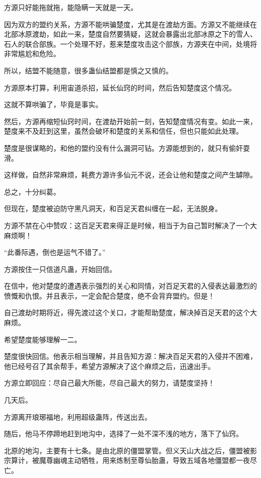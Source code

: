 \begin{this_body}
方源只好能拖就拖，能隐瞒一天就是一天。

因为双方的盟约关系，方源不能哄骗楚度，尤其是在渡劫方面。方源又不能继续在北部冰原渡劫，如此一来，楚度自然要猜疑，这就会暴露出北部冰原之下的雪人、石人的联合部族。一个处理不好，惹来楚度攻击这个部族，方源夹在中间，处境将非常尴尬和危险。

所以，结盟不能随意，很多蛊仙结盟都是慎之又慎的。

方源原本打算，利用宙道杀招，延长仙窍的时间，然后告知楚度这个情况。

这就不算哄骗了，毕竟是事实。

然后，方源再缩短仙窍时间，在渡劫开始前一刻，告知楚度情况有变。如此一来，楚度来不及赶到这里，虽然会破坏和楚度的关系和信任，但也只能如此处理。

楚度是很谋略的，和他的盟约没有什么漏洞可钻。方源能想到的，就只有偷奸耍滑。

这样做，自然非常麻烦，耗费方源许多仙元不说，还会让他和楚度之间产生罅隙。

总之，十分纠葛。

但现在，楚度被迫防守黑凡洞天，和百足天君纠缠在一起，无法脱身。

方源不禁在心中赞叹：这百足天君来得正是时候，相当于为自己暂时解决了一个大麻烦啊！

“此番际遇，倒也是运气不错了。”

方源按住一只信道凡蛊，开始回信。

在信中，他对楚度的遭遇表示强烈的关心和同情，对百足天君的入侵表达最激烈的愤慨和仇恨。并且表示，一定会配合楚度，绝不会背弃盟约。但是！

自己渡劫时期将近，得先渡过这个关口，才能帮助楚度，解决掉百足天君的这个大麻烦。

希望楚度能够理解一二。

楚度很快回信。他表示相当理解，并且告知方源：解决百足天君的入侵并不困难，他已经号召了其余帮手，希望方源解决了这个麻烦之后，迅速出手。

方源立即回应：尽自己最大所能，尽自己最大的努力，请楚度坚持！

几天后。

方源离开琅琊福地，利用超级蛊阵，传送出去。

随后，他马不停蹄地赶到地沟中，选择了一处不深不浅的地方，落下了仙窍。

北原的地沟，主要有十七条。是由北原的僵盟掌管。但义天山大战之后，僵盟被影宗算计，被魔尊幽魂主动牺牲，用来炼制至尊仙胎蛊，导致五域各地僵盟都一夜尽亡。


\end{this_body}
